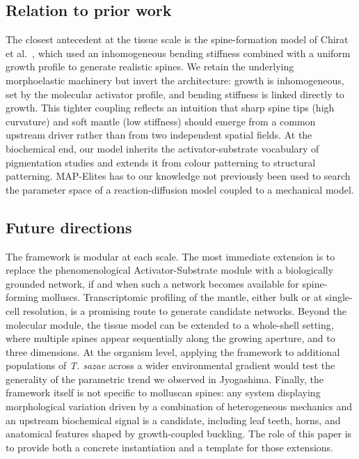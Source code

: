 \documentclass[11pt]{article}
\begin{document}
\subsection{Relation to prior work}

The closest antecedent at the tissue scale is the spine-formation model of
Chirat et al.\ \citep{chirat2013mechanical}, which used an inhomogeneous
bending stiffness combined with a uniform growth profile to generate
realistic spines. We retain the underlying morphoelastic machinery but
invert the architecture: growth is inhomogeneous, set by the molecular
activator profile, and bending stiffness is linked directly to growth.
This tighter coupling reflects an intuition that sharp spine tips
(high curvature) and soft mantle (low stiffness) should emerge from a
common upstream driver rather than from two independent spatial fields.
At the biochemical end, our model inherits the activator-substrate
vocabulary of pigmentation studies
\citep{fowler1992modeling,meinhardt1987model} and extends it from
colour patterning to structural patterning. MAP-Elites
\citep{mouret2015illuminating} has to our knowledge not previously been
used to search the parameter space of a reaction-diffusion model coupled
to a mechanical model.

\subsection{Future directions}

The framework is modular at each scale. The most immediate extension is
to replace the phenomenological Activator-Substrate module with a
biologically grounded network, if and when such a network becomes
available for spine-forming molluscs. Transcriptomic profiling of the
mantle, either bulk or at single-cell resolution, is a promising route
to generate candidate networks. Beyond the molecular module, the tissue
model can be extended to a whole-shell setting, where multiple spines
appear sequentially along the growing aperture, and to three dimensions.
At the organism level, applying the framework to additional populations
of \textit{T. sazae} across a wider environmental gradient would test the
generality of the parametric trend we observed in Jyogashima. Finally,
the framework itself is not specific to molluscan spines: any system
displaying morphological variation driven by a combination of
heterogeneous mechanics and an upstream biochemical signal is a
candidate, including leaf teeth, horns, and anatomical features shaped by
growth-coupled buckling. The role of this paper is to provide both a
concrete instantiation and a template for those extensions.


\end{document}

